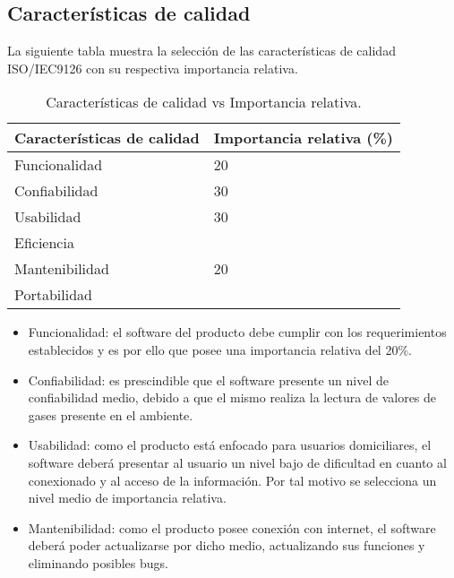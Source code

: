 \documentclass[
11pt, %
]{charter}
\begin{document}
\subsection{Características de calidad}
La siguiente tabla muestra la selección de las características de calidad
ISO/IEC9126 con su respectiva importancia relativa.

\begin{table}[ht]
    \centering
    \begin{tabular}{|l|l|}\hline \hline
    \rowcolor[HTML]{d6c6c3}
        \bf Características de calidad & \bf Importancia relativa (\%) \\
        \hline
        \hline
        Funcionalidad                  & 20                            \\
        Confiabilidad                  & 30                            \\
        Usabilidad                     & 30                            \\
        Eficiencia                     &                               \\
        Mantenibilidad                 & 20                            \\
        Portabilidad                   &                               \\
        \hline
    \end{tabular}
    \caption{Características de calidad vs Importancia relativa.}
\end{table}
\begin{itemize}
    \item Funcionalidad: el software del producto debe cumplir con los
          requerimientos establecidos y es por ello que posee una importancia
          relativa
          del 20\%.

    \item Confiabilidad: es prescindible que el software presente un nivel de
          confiabilidad medio, debido a que el mismo realiza la lectura de
          valores de
          gases presente en el ambiente.
    \item Usabilidad: como el producto está enfocado para usuarios
          domiciliares, el software deberá presentar al usuario un nivel bajo de
          dificultad en cuanto al conexionado y al acceso de la información. Por tal
          motivo se selecciona un nivel medio de importancia relativa.
    \item Mantenibilidad: como el producto posee conexión con internet, el
          software deberá poder actualizarse por dicho medio, actualizando sus funciones
          y eliminando posibles bugs.
\end{itemize}
\end{document}
